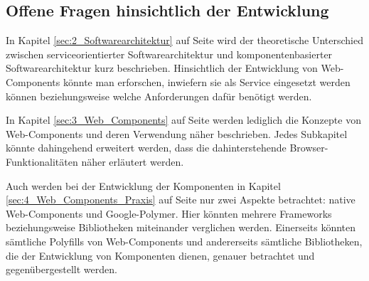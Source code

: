 \subsection{Offene Fragen hinsichtlich der Entwicklung}
\label{sec:5_Fragen}

In Kapitel \ref{sec:2_Softwarearchitektur} auf Seite \pageref{sec:2_Softwarearchitektur} wird der theoretische Unterschied zwischen serviceorientierter Softwarearchitektur und komponentenbasierter Softwarearchitektur kurz beschrieben. Hinsichtlich der Entwicklung von Web-Components könnte man erforschen, inwiefern sie als Service eingesetzt werden können beziehungsweise welche Anforderungen dafür benötigt werden.

In Kapitel \ref{sec:3_Web_Components} auf Seite \pageref{sec:3_Web_Components} werden lediglich die Konzepte von Web-Components und deren Verwendung näher beschrieben. Jedes Subkapitel könnte dahingehend erweitert werden, dass die dahinterstehende Browser-Funktionalitäten näher erläutert werden.

Auch werden bei der Entwicklung der Komponenten in Kapitel \ref{sec:4_Web_Components_Praxis} auf Seite \pageref{sec:4_Web_Components_Praxis} nur zwei Aspekte betrachtet: native Web-Components und Google-Polymer. Hier könnten mehrere Frameworks beziehungsweise Bibliotheken miteinander verglichen werden. Einerseits könnten sämtliche Polyfills von Web-Components und andererseits sämtliche Bibliotheken, die der Entwicklung von Komponenten dienen, genauer betrachtet und gegenübergestellt werden.